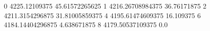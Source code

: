 0 4225.12109375 45.61572265625
1 4216.26708984375 36.76171875
2 4211.3154296875 31.81005859375
4 4195.61474609375 16.109375
6 4184.14404296875 4.638671875
8 4179.50537109375 0.0
